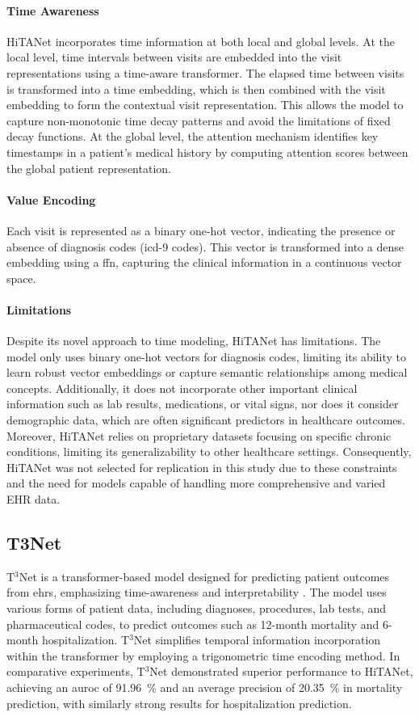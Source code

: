 \paragraph{Time Awareness}
HiTANet incorporates time information at both local and global levels. At the local level, time intervals between visits are embedded into the visit representations using a time-aware transformer. The elapsed time between visits is transformed into a time embedding, which is then combined with the visit embedding to form the contextual visit representation. This allows the model to capture non-monotonic time decay patterns and avoid the limitations of fixed decay functions. At the global level, the attention mechanism identifies key timestamps in a patient's medical history by computing attention scores between the global patient representation.

\paragraph{Value Encoding}
Each visit is represented as a binary one-hot vector, indicating the presence or absence of diagnosis codes (\gls{icd}-9 codes). This vector is transformed into a dense embedding using a \gls{ffn}, capturing the clinical information in a continuous vector space.

\paragraph{Limitations}
Despite its novel approach to time modeling, HiTANet has limitations. The model only uses binary one-hot vectors for diagnosis codes, limiting its ability to learn robust vector embeddings or capture semantic relationships among medical concepts. Additionally, it does not incorporate other important clinical information such as lab results, medications, or vital signs, nor does it consider demographic data, which are often significant predictors in healthcare outcomes. Moreover, HiTANet relies on proprietary datasets focusing on specific chronic conditions, limiting its generalizability to other healthcare settings. Consequently, HiTANet was not selected for replication in this study due to these constraints and the need for models capable of handling more comprehensive and varied EHR data.

\subsection{T3Net}
T$^3$Net is a transformer-based model designed for predicting patient outcomes from \glspl{ehr}, emphasizing time-awareness and interpretability \cite{T3Net2021}. The model uses various  forms of patient data, including diagnoses, procedures, lab tests, and pharmaceutical codes, to predict outcomes such as 12-month mortality and 6-month hospitalization. T$^3$Net simplifies temporal information incorporation within the transformer by employing a trigonometric time encoding method. In comparative experiments, T$^3$Net  demonstrated superior performance to HiTANet, achieving an \gls{auroc} of \qty{91.96}{\percent} and an average precision of \qty{20.35}{\percent} in mortality prediction, with similarly strong results for hospitalization prediction.

